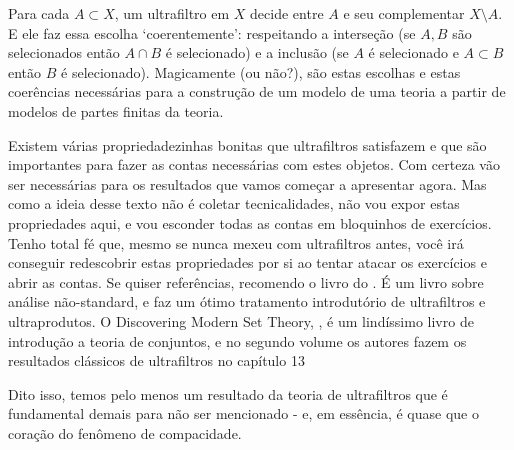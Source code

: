 \documentclass[11pt]{article}
\theoremstyle{definition}
\theoremstyle{definition}
\theoremstyle{definition}
\theoremstyle{definition}
\theoremstyle{definition}
\theoremstyle{definition}
\theoremstyle{definition}
\theoremstyle{definition}
\theoremstyle{definition}
\theoremstyle{definition}
\theoremstyle{definition}
\theoremstyle{definition}
\theoremstyle{definition}
\begin{document}
Para cada $A \subset X$, um ultrafiltro em $X$ decide entre $A$ e seu complementar $X \setminus A$. E ele faz essa escolha `coerentemente': respeitando a interseção (se $A,B$ são selecionados então $A \cap B$ é selecionado) e a inclusão (se $A$ é selecionado e $A \subset B$ então $B$ é selecionado). Magicamente (ou não?), são estas escolhas e estas coerências necessárias para a construção de um modelo de uma teoria a partir de modelos de partes finitas da teoria.

Existem várias propriedadezinhas bonitas que ultrafiltros satisfazem e que são importantes para fazer as contas necessárias com estes objetos. Com certeza vão ser necessárias para os resultados que vamos começar a apresentar agora. Mas como a ideia desse texto não é coletar tecnicalidades, não vou expor estas propriedades aqui, e vou esconder todas as contas em bloquinhos de exercícios. Tenho total fé que, mesmo se nunca mexeu com ultrafiltros antes, você irá conseguir redescobrir estas propriedades por si ao tentar atacar os exercícios e abrir as contas. Se quiser referências, recomendo o livro do \cite{goldblatt2012lectures}. É um livro sobre análise não-standard, e faz um ótimo tratamento introdutório de ultrafiltros e ultraprodutos. O Discovering Modern Set Theory, \cite{Just1997}, é um lindíssimo livro de introdução a teoria de conjuntos, e no segundo volume os autores fazem os resultados clássicos de ultrafiltros no capítulo 13

Dito isso, temos pelo menos um resultado da teoria de ultrafiltros que é fundamental demais para não ser mencionado - e, em essência, é quase que o coração do fenômeno de compacidade.
\end{document}
